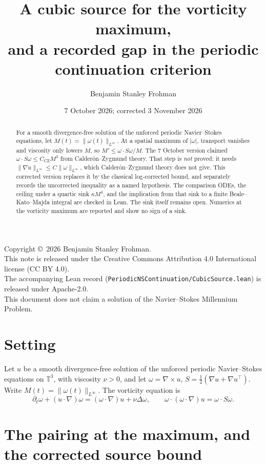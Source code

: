 \documentclass[11pt]{article}
\title{A cubic source for the vorticity maximum,\\ and a recorded gap in the periodic continuation criterion}
\author{Benjamin Stanley Frohman}
\date{7 October 2026; corrected 3 November 2026}
\theoremstyle{definition}
\theoremstyle{remark}
\begin{document}
\maketitle
\sloppy
\begin{center}
Copyright \copyright\ 2026 Benjamin Stanley Frohman.\\
This note is released under the Creative Commons Attribution 4.0 International license (CC BY 4.0).\\
The accompanying Lean record (\texttt{PeriodicNSContinuation/CubicSource.lean}) is released under Apache-2.0.\\
This document does not claim a solution of the Navier--Stokes Millennium Problem.
\end{center}

\begin{abstract}
For a smooth divergence-free solution of the unforced periodic Navier--Stokes equations, let $M(t)=\|\omega(t)\|_{L^\infty}$. At a spatial maximum of $|\omega|$, transport vanishes and viscosity only lowers $M$, so $M'\le \omega\cdot S\omega/M$. The 7 October version claimed $\omega\cdot S\omega\le C_{\mathrm{CZ}}M^3$ from Calder\'on--Zygmund theory. That step is \emph{not} proved: it needs $\|\nabla u\|_{L^\infty}\le C\|\omega\|_{L^\infty}$, which Calder\'on--Zygmund theory does not give. This corrected version replaces it by the classical log-corrected bound, and separately records the uncorrected inequality as a named hypothesis. The comparison ODEs, the ceiling under a quartic sink $\kappa M^4$, and the implication from that sink to a finite Beale--Kato--Majda integral are checked in Lean. The sink itself remains open. Numerics at the vorticity maximum are reported and show no sign of a sink.
\end{abstract}

\section{Setting}
Let $u$ be a smooth divergence-free solution of the unforced periodic Navier--Stokes equations on $\mathbb{T}^3$, with viscosity $\nu>0$, and let $\omega=\nabla\times u$, $S=\tfrac12(\nabla u+\nabla u^{\top})$. Write $M(t)=\|\omega(t)\|_{L^\infty}$. The vorticity equation is
\[
\partial_t\omega+(u\cdot\nabla)\omega=(\omega\cdot\nabla)u+\nu\Delta\omega,
\qquad \omega\cdot(\omega\cdot\nabla)u=\omega\cdot S\omega .
\]

\section{The pairing at the maximum, and the corrected source bound}
\end{document}
